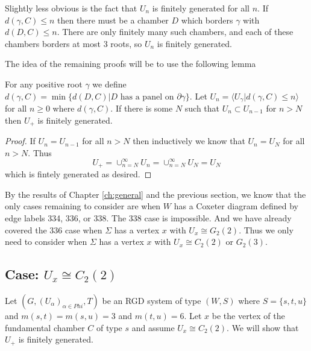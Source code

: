 \documentclass[class=book, crop=false]{standalone}
\begin{document}
Slightly less obvious is the fact that $U_n$ is finitely generated for all $n.$ If $d(\gamma,C)\le n$ then there must be a chamber $D$ which borders $\gamma$ with $d(D,C)\le n.$ There are only finitely many such chambers, and each of these chambers borders at most 3 roots, so $U_n$ is finitely generated.

The idea of the remaining proofs will be to use the following lemma
\begin{lemma} 
	For any positive root $\gamma$ we define $d(\gamma,C)=\min\{d(D,C)|D\text{ has a panel on }\partial \gamma\}.$ Let $U_n=\langle U_\gamma |d(\gamma,C)\le n\rangle$ for all $n\ge 0$ where $d(\gamma,C).$ If there is some $N$ such that $U_n\subset U_{n-1}$ for $n>N$ then $U_+$ is finitely generated.
	\label{fgcond}
\end{lemma}
\begin{proof}
	If $U_n=U_{n-1}$ for all $n> N$ then inductively we know that $U_n=U_N$ for all $n>N.$ Thus
	\[
		U_+=\cup_{n=N}^{\infty}{U_n}=\cup_{n=N}^\infty U_N=U_N
	\]
	which is fintely generated as desired.
\end{proof}

By the results of Chapter \ref{ch:general} and the previous section, we know that the only cases remaining to consider are when $W$ has a Coxeter diagram defined by edge labels 334, 336, or 338. The 338 case is impossible. And we have already covered the 336 case when $\Sigma$ has a vertex $x$ with $U_x\cong G_2(2).$ Thus we only need to consider when $\Sigma$ has a vertex $x$ with $U_x\cong C_2(2)$ or $G_2(3).$

\subsection{Case: $U_x\cong C_2(2)$}

Let $(G,(U_\alpha)_{\alpha\in Phi},T)$ be an RGD system of type $(W,S)$ where $S=\{s,t,u\}$ and $m(s,t)=m(s,u)=3$ and $m(t,u)=6.$ Let $x$ be the vertex of the fundamental chamber $C$ of type $s$ and assume $U_x\cong C_2(2).$ We will show that $U_+$ is finitely generated.
\end{document}

